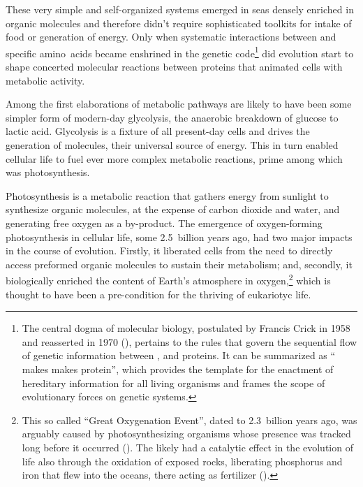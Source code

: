 \documentclass{tufte-book}
\begin{document}
These very simple and \mbox{self-organized} systems emerged in seas densely
enriched in organic molecules and therefore didn't require sophisticated
toolkits for intake of food or generation of energy.  Only when systematic
interactions between  and specific amino~acids became enshrined in
the genetic code\footnote{The central dogma of molecular biology, postulated by
  Francis Crick in 1958 and reasserted in 1970
  (\citealp{crick_protein_1958,crick_central_1970}), pertains to the rules that
  govern the sequential flow of genetic information between ,
   and proteins. It can be summarized as `` makes
   makes protein'', which provides the template for the enactment of
  hereditary information for all living organisms and frames the scope of
  evolutionary forces on genetic systems.} did evolution start to shape
concerted molecular reactions between proteins that animated cells with
metabolic activity.

Among the first elaborations of metabolic pathways are likely to have been some
simpler form of \mbox{modern-day} glycolysis, the anaerobic breakdown of glucose
to lactic acid.  Glycolysis is a fixture of all \mbox{present-day} cells and
drives the generation of  molecules, their universal source of
energy.  This in turn enabled cellular life to fuel ever more complex metabolic
reactions, prime among which was photosynthesis.

Photosynthesis is a metabolic reaction that gathers energy from sunlight to
synthesize organic molecules, at the expense of carbon dioxide and water, and
generating free oxygen as a \mbox{by-product}.  The emergence of
\mbox{oxygen-forming} photosynthesis in cellular life, some 2.5~billion years
ago, had two major impacts in the course of evolution.  Firstly, it liberated
cells from the need to directly access preformed organic molecules to sustain
their metabolism; and, secondly, it biologically enriched the content of Earth's
atmosphere in oxygen,\footnote{This so called ``Great Oxygenation Event'', dated
  to 2.3~billion years ago, was arguably caused by photosynthesizing organisms
  whose presence was tracked long before it occurred
  (\citealp{flannery_archean_2012}). The  likely had a catalytic
  effect in the evolution of life also through the oxidation of exposed rocks,
  liberating phosphorus and iron that flew into the oceans, there acting as
  fertilizer (\citealp{zimmer_mystery_2013}).} which is thought to have been a
\mbox{pre-condition} for the thriving of eukariotyc life.
\end{document}
